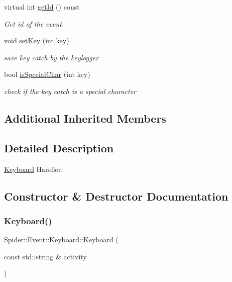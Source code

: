 \begin{DoxyCompactItemize}
virtual int \hyperlink{class_spider_1_1_event_1_1_keyboard_aea1252251ac9ee1c7b71d0b0fcc7cc0a}{get\+Id} () const
\begin{DoxyCompactList}\small\item\em Get id of the event. \end{DoxyCompactList}\item 
void \hyperlink{class_spider_1_1_event_1_1_keyboard_adde706a751b1df210bb459dcc33c05a8}{set\+Key} (int key)
\begin{DoxyCompactList}\small\item\em save key catch by the keylogger \end{DoxyCompactList}\item 
bool \hyperlink{class_spider_1_1_event_1_1_keyboard_a3d89487e20e8ad9f2d0889e0c57858e5}{is\+Special\+Char} (int key)
\begin{DoxyCompactList}\small\item\em check if the key catch is a special character \end{DoxyCompactList}\end{DoxyCompactItemize}
\subsection*{Additional Inherited Members}


\subsection{Detailed Description}
\hyperlink{class_spider_1_1_event_1_1_keyboard}{Keyboard} Handler. 

\subsection{Constructor \& Destructor Documentation}
\mbox{\label{class_spider_1_1_event_1_1_keyboard_a1fd20c190955bbe2856124e7f41dd8b7}} 
\subsubsection{\texorpdfstring{Keyboard()}{Keyboard()}}
{\footnotesize\ttfamily Spider\+::\+Event\+::\+Keyboard\+::\+Keyboard (\begin{DoxyParamCaption}\item[{const std\+::string \&}]{activity }\end{DoxyParamCaption})\hspace{0.3cm}{\ttfamily [inline]}}



